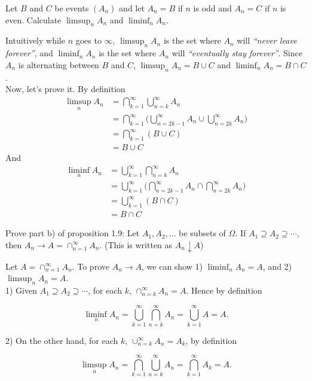 \newpage
\begin{exercise}
  Let $B$ and $C$ be events $(A_n)$ and let $A_n=B$ if $n$ is odd and $A_n=C$ if $n$ is even. Calculate $\limsup_{n} A_n$ and $\liminf_{n} A_n$.
\end{exercise}
\begin{solution}
  Intuitively while $n$ goes to $\infty$, $\limsup_{n} A_n$ is the set where $A_n$ will \textit{``never leave forever''}, and $\liminf_{n} A_n$ is the set where $A_n$ will \textit{``eventually stay forever''}. Since $A_n$ is alternating between $B$ and $C$, $\limsup_{n} A_n = B\cup C$ and $\liminf_{n} A_n = B\cap C$. \\

  Now, let's prove it. By definition
  \begin{align*}
    \limsup_n A_n &= \bigcap_{k=1}^\infty\bigcup_{n=k}^\infty A_n \\
      &= \bigcap_{k=1}^\infty(\bigcup_{n=2k-1}^{\infty}A_n\cup \bigcup_{n=2k}^{\infty}A_n\big) \\
      &= \bigcap_{k=1}^\infty (B\cup C) \\
      &= B \cup C
  \end{align*}
  And
  \begin{align*}
    \liminf_n A_n &= \bigcup_{k=1}^\infty\bigcap_{n=k}^\infty A_n \\
      &= \bigcup_{k=1}^\infty(\bigcap_{n=2k-1}^{\infty}A_n\cap \bigcap_{n=2k}^{\infty}A_n\big) \\
      &= \bigcup_{k=1}^\infty (B\cap C) \\
      &= B \cap C
  \end{align*}
\end{solution}


\begin{exercise}
  Prove part b) of proposition 1.9: Let $A_1,A_2,\ldots$ be subsets of $\Omega$. If $A_1\supseteq A_2\supseteq \cdots$, then $A_n\to A=\cap_{n=1}^\infty A_n$. (This is written as $A_n\downarrow A$)
\end{exercise}
\begin{solution}
  Let $A=\cap_{n=1}^\infty A_n$. To prove $A_n\to A$, we can show 1) $\liminf_n A_n = A$, and 2) $\limsup_n A_n = A$. \\

  1) Given $A_1\supseteq A_2\supseteq \cdots$, for each $k$, $\cap_{n=k}^\infty A_n=A$. Hence by definition

  \[ \liminf_n A_n = \bigcup_{k=1}^\infty\bigcap_{n=k}^\infty A_n=\bigcup_{k=1}^\infty A = A .\]

  2) On the other hand, for each $k$, $\cup_{n=k}^\infty A_n = A_k$, by definition

  \[ \limsup_n A_n = \bigcap_{k=1}^\infty\bigcup_{n=k}^\infty A_n = \bigcap_{k=1}^\infty A_k = A .\]
\end{solution}


